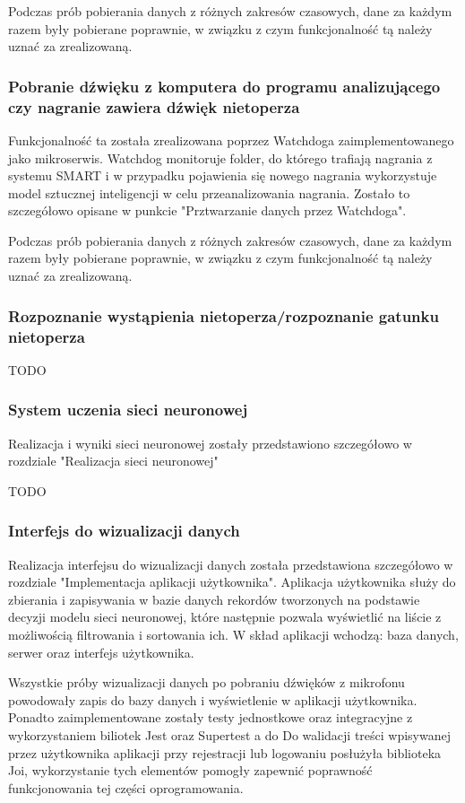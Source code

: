 \documentclass{sprz}
\begin{document}
Podczas prób pobierania danych z różnych zakresów czasowych, dane za każdym razem były pobierane poprawnie, w związku z czym funkcjonalność tą należy uznać za zrealizowaną.

\subsubsection{Pobranie dźwięku z komputera do programu analizującego czy nagranie zawiera dźwięk nietoperza}
Funkcjonalność ta została zrealizowana poprzez Watchdoga zaimplementowanego jako mikroserwis. Watchdog monitoruje folder, do którego trafiają nagrania z systemu SMART i w przypadku pojawienia się nowego nagrania wykorzystuje model sztucznej inteligencji w celu przeanalizowania nagrania. Zostało to szczegółowo opisane w punkcie "Prztwarzanie danych przez Watchdoga". 


Podczas prób pobierania danych z różnych zakresów czasowych, dane za każdym razem były pobierane poprawnie, w związku z czym funkcjonalność tą należy uznać za zrealizowaną.

\subsubsection{Rozpoznanie wystąpienia nietoperza/rozpoznanie gatunku nietoperza}
TODO


\subsubsection{System uczenia sieci neuronowej}
Realizacja i wyniki sieci neuronowej zostały przedstawiono szczegółowo w rozdziale "Realizacja sieci neuronowej"


TODO

\subsubsection{Interfejs do wizualizacji danych}
Realizacja interfejsu do wizualizacji danych została przedstawiona szczegółowo w rozdziale "Implementacja aplikacji użytkownika". Aplikacja użytkownika służy do zbierania i zapisywania w bazie danych rekordów tworzonych na podstawie decyzji modelu sieci neuronowej, które następnie pozwala wyświetlić na liście z możliwością filtrowania i sortowania ich. W skład aplikacji wchodzą: baza danych, serwer oraz interfejs użytkownika. 


Wszystkie próby wizualizacji danych po pobraniu dźwięków z mikrofonu powodowały zapis do bazy danych i wyświetlenie w aplikacji użytkownika. Ponadto zaimplementowane zostały testy jednostkowe oraz integracyjne z wykorzystaniem biliotek Jest oraz Supertest a do Do walidacji treści wpisywanej przez użytkownika aplikacji przy rejestracji lub logowaniu posłużyła biblioteka Joi, wykorzystanie tych elementów pomogły zapewnić poprawność funkcjonowania tej części oprogramowania.
\end{document}
